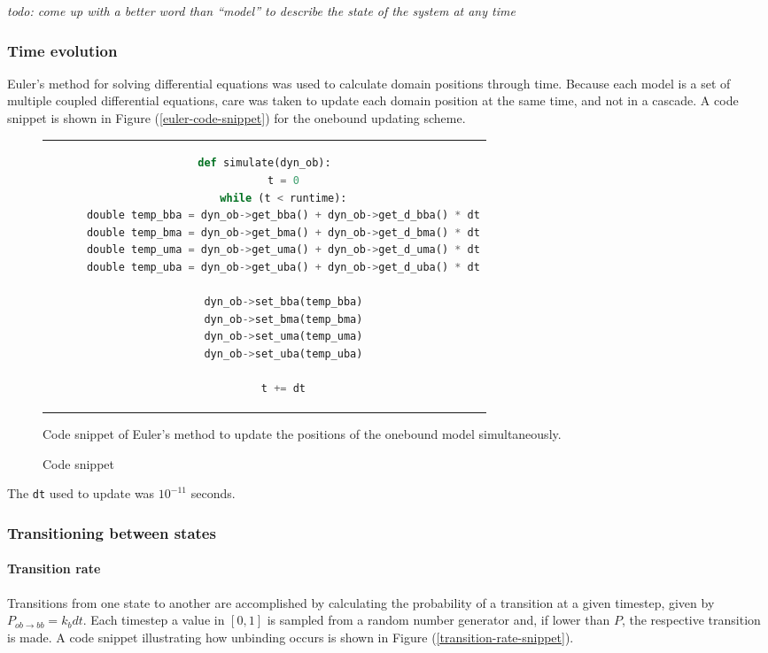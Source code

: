 \documentclass[10pt]{article} %
\begin{document}
\textit{todo: come up with a better word than ``model'' to describe the state of the system at any time}
\subsubsection{Time evolution}
Euler's method for solving differential equations was used to calculate domain positions through time. Because each model is a set of multiple coupled differential equations, care was taken to update each domain position at the same time, and not in a cascade. A code snippet is shown in Figure (\ref{euler-code-snippet}) for the onebound updating scheme.

\begin{figure}[h!]
  \centering
  \begin{tabular}{c}
    \begin{lstlisting}[language=python]
      def simulate(dyn_ob):
      t = 0
      while (t < runtime):
      double temp_bba = dyn_ob->get_bba() + dyn_ob->get_d_bba() * dt
      double temp_bma = dyn_ob->get_bma() + dyn_ob->get_d_bma() * dt
      double temp_uma = dyn_ob->get_uma() + dyn_ob->get_d_uma() * dt
      double temp_uba = dyn_ob->get_uba() + dyn_ob->get_d_uba() * dt

      dyn_ob->set_bba(temp_bba)
      dyn_ob->set_bma(temp_bma)
      dyn_ob->set_uma(temp_uma)
      dyn_ob->set_uba(temp_uba)

      t += dt
    \end{lstlisting}
  \end{tabular}
  \caption{Code snippet}{Code snippet of Euler's method to update the positions of the onebound model simultaneously.}
  \label{ob_struct}
\end{figure}

The \verb|dt| used to update was $10^{-11}$ seconds.

\subsubsection{Transitioning between states}

\paragraph{Transition rate}
\label{sec:transitioning-states}
Transitions from one state to another are accomplished by calculating the probability of a transition at a given timestep, given by $P_{ob\rightarrow bb} = k_bdt$. Each timestep a value in $[0,1]$ is sampled from a random number generator and, if lower than $P$, the respective transition is made. A code snippet illustrating how unbinding occurs is shown in Figure (\ref{transition-rate-snippet}).
\end{document}
